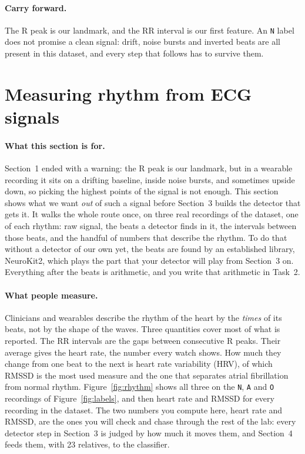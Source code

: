 \documentclass[12pt,article,oneside,linkcolour=blue]{oxengthesis}
\newcommand{\nb}[1]{\noindent{\small\textsf{Notebook: #1}}\par\nopagebreak\smallskip}
\begin{document}
\paragraph{Carry forward.} The R peak is our landmark, and the RR interval is our first
feature. An \texttt{N} label does not promise a clean signal: drift, noise bursts and inverted
beats are all present in this dataset, and every step that follows has to survive them.


\section{Measuring rhythm from ECG signals}
\nb{Section 2}

\paragraph{What this section is for.} Section~1 ended with a warning: the R peak is our
landmark, but in a wearable recording it sits on a drifting baseline, inside noise bursts, and
sometimes upside down, so picking the highest points of the signal is not enough. This section
shows what we want \emph{out} of such a signal before Section~3 builds the detector that
gets it. It walks the whole route once, on three real recordings of the dataset, one of each
rhythm: raw signal, the beats a detector finds in it, the intervals between those beats, and the
handful of numbers that describe the rhythm. To do that without a detector of our own yet, the
beats are found by an established library, NeuroKit2, which plays the part that your detector
will play from Section~3 on. Everything after the beats is arithmetic, and you write that
arithmetic in Task~2.

\paragraph{What people measure.} Clinicians and wearables describe the rhythm of the heart by
the \emph{times} of its beats, not by the shape of the waves. Three quantities cover most of what
is reported. The RR intervals are the gaps between consecutive R peaks. Their average gives the
heart rate, the number every watch shows. How much they change from one beat to the next is
heart rate variability (HRV), of which RMSSD is the most used measure and the one that separates
atrial fibrillation from normal rhythm. Figure~\ref{fig:rhythm} shows all three on the
\texttt{N}, \texttt{A} and \texttt{O} recordings of Figure~\ref{fig:labels}, and then heart rate
and RMSSD for every recording in the dataset. The two numbers you compute here, heart rate and
RMSSD, are the ones you will check and chase through the rest of the lab: every detector step in
Section~3 is judged by how much it moves them, and Section~4 feeds them, with 23 relatives, to
the classifier.
\end{document}
